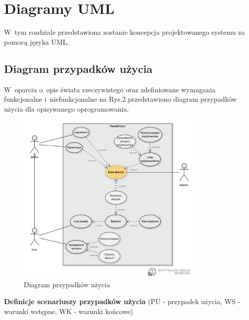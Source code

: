 \documentclass[12pt, letterpaper]{article}
\begin{document}
		\section{Diagramy UML}

		W~tym rozdziale przedstawiona zostanie koncepcja projektowanego systemu za pomocą języka UML.		
		
		\subsection{Diagram przypadków użycia}
		
		W~oparciu o~opis świata rzeczywistego oraz zdefiniowane wymagania funkcjonalne i~niefunkcjonalne na Rys.2 przedstawiono diagram przypadków użycia dla opisywanego oprogramowania.

\begin{figure}[h]
  \centering
      \includegraphics[width=0.8\textwidth]{useCaseDiagram}
  \caption{Diagram przypadków użycia}
\end{figure}			
		
		

		\newpage		
		
		\textbf{Definicje scenariuszy przypadków użycia} (PU - przypadek użycia, WS - warunki wstępne, WK - warunki końcowe)\\
		
		\quad		
		
\end{document}
